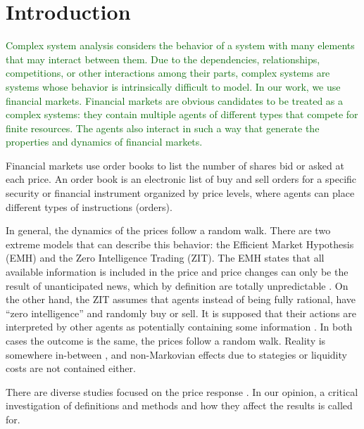 \section{Introduction}\label{sec:introduction}

\textcolor{darkgreen}{Complex system analysis considers the behavior of a
system with many elements that may interact between them. Due to the
dependencies, relationships, competitions, or other interactions among their
parts, complex systems are systems whose behavior is intrinsically difficult to
model. In our work, we use financial markets. Financial markets are obvious
candidates to be treated as a complex systems: they contain multiple agents of
different types that compete for finite resources. The agents also interact in
such a way that generate the properties and dynamics of financial markets.}

Financial markets use order books to list the number of shares bid or asked at
each price. An order book is an electronic list of buy and sell orders for a
specific security or financial instrument organized by price levels, where
agents can place different types of instructions (orders).

In general, the dynamics of the prices follow a random walk. There are two
extreme models that can describe this behavior: the Efficient Market Hypothesis
(EMH) and the Zero Intelligence Trading (ZIT). The EMH states that all
available information is included in the price and price changes can only be
the result of unanticipated news, which by definition are totally unpredictable
\cite{subtle_nature,Bouchaud_2004,EMH_lillo,stat_theory}. On the other hand,
the ZIT assumes that agents instead of being fully rational, have ``zero
intelligence” and randomly buy or sell. It is supposed that their actions are
interpreted by other agents as potentially containing some information
\cite{subtle_nature,Bouchaud_2004,stat_theory,Wang_2016_cross}.
In both cases the outcome is the same, the prices follow a random walk. Reality
is somewhere in-between \cite{Bouchaud_2004,stat_theory}, and non-Markovian
effects due to stategies or liquidity costs are not contained either.

There are diverse studies focused on the price response
\cite{prop_order_book,dissecting_cross,r_walks_liquidity,subtle_nature,Bouchaud_2004,large_prices_changes,pow_law_dist,theory_market_impact,spread_changes_affect,master_curve,EMH_lillo,quant_stock_price_response,ori_pow_law,Wang_2018_b,Wang_2018_a,Wang_2016_avg,Wang_2016_cross}.
In our opinion, a critical investigation of definitions and methods and how
they affect the results is called for.

